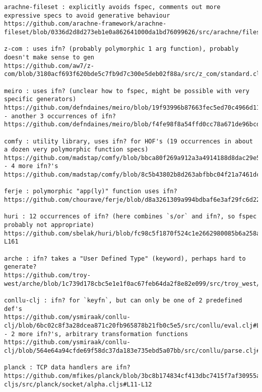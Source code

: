 \begingroup
    \fontsize{5pt}{7pt}\selectfont
\begin{verbatim}
arachne-fileset : explicitly avoids fspec, comments out more expressive specs to avoid generative behaviour
https://github.com/arachne-framework/arachne-fileset/blob/0336d2d8d273eb1e0a862641000da1bd76099626/src/arachne/fileset/specs.clj#L7

z-com : uses ifn? (probably polymorphic 1 arg function), probably doesn't make sense to gen
https://github.com/aw7/z-com/blob/3180acf693f620bde5c7fb9d7c300e5deb02f88a/src/z_com/standard.cljs#L18

meiro : uses ifn? (unclear how to fspec, might be possible with very specific generators)
https://github.com/defndaines/meiro/blob/19f93996b87663fec5ed70c4966d114aa4855d6b/src/meiro/backtracker.clj#L17
- another 3 occurrences of ifn?
https://github.com/defndaines/meiro/blob/f4fe98f8a54ffd0cc78a671de96bcd9727904c0c/src/meiro/core.clj#L201

comfy : utility library, uses ifn? for HOF's (19 occurrences in about a dozen very polymorphic function specs)
https://github.com/madstap/comfy/blob/bbca80f269a912a3a4914188d8dac29e5edaca0b/src/madstap/comfy.cljc
- 4 more ifn?'s
https://github.com/madstap/comfy/blob/8c5b43802b8d263abfbbc04f21a7461dcfa08d49/src/madstap/comfy/alpha.cljc

ferje : polymorphic "app(ly)" function uses ifn?
https://github.com/chourave/ferje/blob/d8a3261309a994bdbaf6e3af29fc6d22c3e51844/src/ferje/util.clj#L33

huri : 12 occurrences of ifn? (here combines `s/or` and ifn?, so fspec probably not appropriate)
https://github.com/sbelak/huri/blob/fc98c5f1870f524c1e2662980085b6a258abd5cf/src/huri/core.clj#L159-L161

arche : ifn? takes a "User Defined Type" (keyword), perhaps hard to generate?
https://github.com/troy-west/arche/blob/1c739d178cbc5e1e1f0ac67feb64da2f8e82e099/src/troy_west/arche/spec.clj#L36

conllu-clj : ifn? for `keyfn`, but can only be one of 2 predefined def's
https://github.com/ysmiraak/conllu-clj/blob/6bc02c8f3a28dcea871c20fb965878b21fb0c5e5/src/conllu/eval.clj#L19
- 2 more ifn?'s, arbitrary transformation functions
https://github.com/ysmiraak/conllu-clj/blob/564e64a94cfde69f58dc37da183e735ebd5a07bb/src/conllu/parse.clj#L42

planck : TCP data handlers are ifn?
https://github.com/mfikes/planck/blob/3bc8b174834cf413dbc7415f7af30955adcc27b0/planck-cljs/src/planck/socket/alpha.cljs#L11-L12


\end{verbatim}
